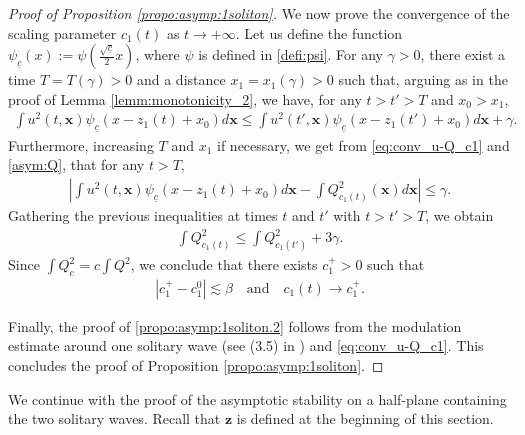\documentclass[reqno,10pt]{amsart}
\numberwithin{equation}{section}
\newcommand{\bx}{\mathbf{x}}
\newcommand{\bz}{\mathbf{z}}
\begin{document}
\begin{proof}[Proof of Proposition \ref{propo:asymp:1soliton}]
	
   We now prove the convergence of the scaling parameter $c_1(t)$ as $t\rightarrow +\infty$. Let us define the function  $\psi_{\underline{c}}(x) := \psi(\frac{\sqrt{\underline{c}}}2 x)$, where $\psi$ is defined in \eqref{defi:psi}. For any $\gamma>0$, there exist a time $T=T(\gamma)>0$ and a distance $x_1=x_1(\gamma)>0$ such that, arguing as in the proof of Lemma \ref{lemm:monotonicity_2}, we have, for any $t>t'>T$ and $x_0>x_1$,
	\begin{align*}
		\int u^2(t,\bx ) \psi_{\underline{c}} (x-z_1(t)+x_0) d\bx \leq \int u^2(t', \bx) \psi_{\underline{c}} (x- z_1(t') + x_0)d\bx + \gamma.
	\end{align*}
		Furthermore, increasing $T$ and $x_1$ if necessary, we get from \eqref{eq:conv_u-Q_c1} and \eqref{asym:Q}, that for any $t>T$,
	\begin{align*}
		\left\vert \int u^2(t, \bx) \psi_{\underline{c}} (x-z_1(t)+x_0) d\bx -\int Q_{c_1(t)}^2(\bx) d \bx \right\vert \leq \gamma.
	\end{align*}
	Gathering the previous inequalities at times $t$ and $t'$ with $t>t'>T$, we obtain
	\begin{align*}
		\int Q_{c_1(t)}^2 \leq \int Q_{c_1(t')}^2 +3 \gamma. 
	\end{align*}
	Since $\int Q_{c}^2= c\int Q^2$, we conclude that there exists $c_1^+>0$ such that
	\begin{align*}
		\left\vert c_1^+ - c_1^0\right\vert \lesssim \beta \quad \text{and} \quad c_1(t) \rightarrow c_1^+.
	\end{align*}

 Finally, the proof of \eqref{propo:asymp:1soliton.2} follows from the modulation estimate around one solitary wave (see (3.5) in \cite{CMPS16}) and \eqref{eq:conv_u-Q_c1}. This concludes the proof of Proposition \ref{propo:asymp:1soliton}. 
 \end{proof}


We continue with the proof of the asymptotic stability on a half-plane containing the two solitary waves. Recall that $\bz$ is defined at the beginning of this section.
\end{document}
